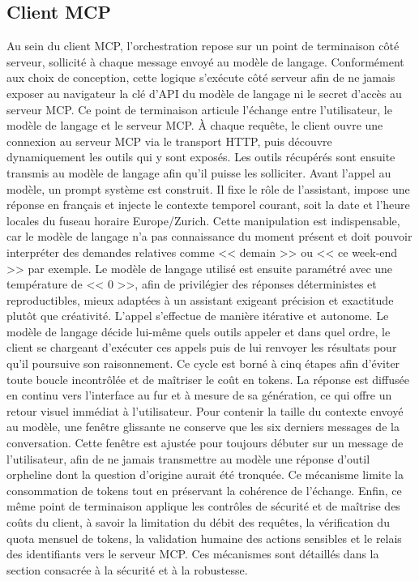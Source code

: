 \documentclass[12pt]{article}
\begin{document}
\subsection{Client MCP}
Au sein du client MCP, l'orchestration repose sur un point de terminaison côté serveur, sollicité à chaque message envoyé au modèle de langage. Conformément aux choix de conception, cette logique s'exécute côté serveur afin de ne jamais exposer au navigateur la clé d'API du modèle de langage ni le secret d'accès au serveur MCP. Ce point de terminaison articule l'échange entre l'utilisateur, le modèle de langage et le serveur MCP.
\newline\newline
À chaque requête, le client ouvre une connexion au serveur MCP via le transport HTTP, puis découvre dynamiquement les outils qui y sont exposés. Les outils récupérés sont ensuite transmis au modèle de langage afin qu'il puisse les solliciter.
\newline\newline
Avant l'appel au modèle, un prompt système est construit. Il fixe le rôle de l'assistant, impose une réponse en français et injecte le contexte temporel courant, soit la date et l'heure locales du fuseau horaire Europe/Zurich. Cette manipulation est indispensable, car le modèle de langage n'a pas connaissance du moment présent et doit pouvoir interpréter des demandes relatives comme << demain >> ou << ce week-end >> par exemple. Le modèle de langage utilisé est ensuite paramétré avec une température de << 0 >>, afin de privilégier des réponses déterministes et reproductibles, mieux adaptées à un assistant exigeant précision et exactitude plutôt que créativité.
\newline\newline
L'appel s'effectue de manière itérative et autonome. Le modèle de langage décide lui-même quels outils appeler et dans quel ordre, le client se chargeant d'exécuter ces appels puis de lui renvoyer les résultats pour qu'il poursuive son raisonnement. Ce cycle est borné à cinq étapes afin d'éviter toute boucle incontrôlée et de maîtriser le coût en tokens. La réponse est diffusée en continu vers l'interface au fur et à mesure de sa génération, ce qui offre un retour visuel immédiat à l'utilisateur.
\newline\newline
Pour contenir la taille du contexte envoyé au modèle, une fenêtre glissante ne conserve que les six derniers messages de la conversation. Cette fenêtre est ajustée pour toujours débuter sur un message de l'utilisateur, afin de ne jamais transmettre au modèle une réponse d'outil orpheline dont la question d'origine aurait été tronquée. Ce mécanisme limite la consommation de tokens tout en préservant la cohérence de l'échange.
\newline\newline
Enfin, ce même point de terminaison applique les contrôles de sécurité et de maîtrise des coûts du client, à savoir la limitation du débit des requêtes, la vérification du quota mensuel de tokens, la validation humaine des actions sensibles et le relais des identifiants vers le serveur MCP. Ces mécanismes sont détaillés dans la section consacrée à la sécurité et à la robustesse.
\end{document}
